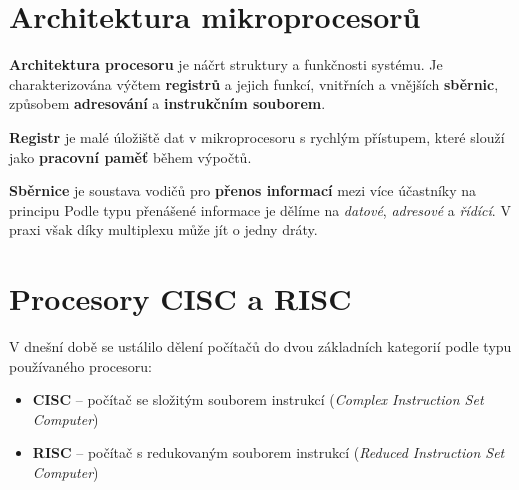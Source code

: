 \section{Architektura mikroprocesorů}
\textbf{Architektura procesoru} je náčrt struktury a funkčnosti systému. Je charakterizována výčtem \textbf{registrů} a jejich funkcí, vnitřních a vnějších \textbf{sběrnic}, způsobem \textbf{adresování} a \textbf{instrukčním souborem}.

\textbf{Registr} je malé úložiště dat v mikroprocesoru s rychlým přístupem, které slouží jako \textbf{pracovní paměť} během výpočtů.

\textbf{Sběrnice} je soustava vodičů pro \textbf{přenos informací} mezi více účastníky na principu  Podle typu přenášené informace je dělíme na \textit{datové}, \textit{adresové} a \textit{řídící}. V praxi však díky multiplexu může jít o jedny dráty.

\section{Procesory CISC a RISC}
V dnešní době se ustálilo dělení počítačů do dvou základních kategorií podle typu používaného procesoru:
\begin{itemize}
    \item{\textbf{CISC} -- počítač se složitým souborem instrukcí (\textit{Complex Instruction Set Computer})}
    \item{\textbf{RISC} -- počítač s redukovaným souborem instrukcí (\textit{Reduced Instruction Set Computer})}
\end{itemize}

